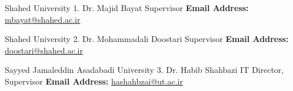 

\begin{cventries}

  \cventry
    {Shahed University} 
    {1. Dr. Majid Bayat} 
    {Supervisor}
    {}
    {\textbf{Email Address:} \href{mailto:mbayat@shahed.ac.ir}{mbayat@shahed.ac.ir}}
  
  \cventry
    {Shahed University} 
    {2. Dr. Mohammadali Doostari} 
    {Supervisor}
    {}
    {\textbf{Email Address:} \href{mailto:doostari@shahed.ac.ir}{doostari@shahed.ac.ir}}

  \cventry
    {Sayyed Jamaleddin Asadabadi University} 
    {3. Dr. Habib Shahbazi} 
    {IT Director, Supervisor}
    {}
    {\textbf{Email Address:} \href{mailto:hashahbzai@ut.ac.ir}{hashahbzai@ut.ac.ir}}
\end{cventries}

